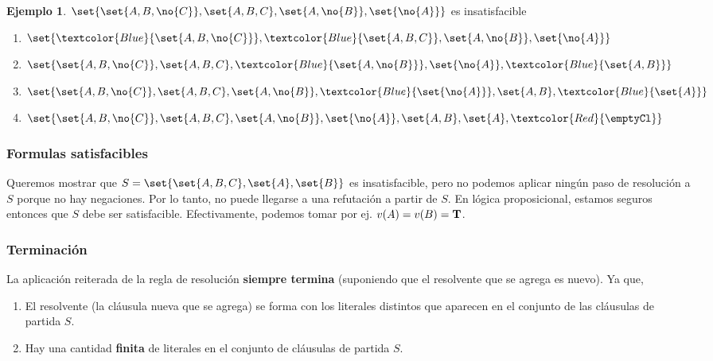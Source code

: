 \documentclass{report}
\theoremstyle{definition} %
\newtheorem*{example*}{Ejemplo}
\newcommand{\changed}[1]{\textcolor{Red}{#1}}
\newcommand{\select}[1]{\textcolor{Blue}{#1}}
\begin{document}
\begin{example*}
\(\set{
    \set{A, B, \no{C}},
    \set{A, B, C},
    \set{A, \no{B}},
    \set{\no{A}}
}\) es insatisfacible
\begin{enumerate}
    \item \(\set{
        \select{\set{A, B, \no{C}}},
        \select{\set{A, B, C}},
        \set{A, \no{B}},
        \set{\no{A}}
    }\)
    \item \(\set{
        \set{A, B, \no{C}},
        \set{A, B, C},
        \select{\set{A, \no{B}}},
        \set{\no{A}},
        \select{\set{A, B}}
    }\)
    \item \(\set{
        \set{A, B, \no{C}},
        \set{A, B, C},
        \set{A, \no{B}},
        \select{\set{\no{A}}},
        \set{A, B},
        \select{\set{A}}
    }\)
    \item \(\set{
        \set{A, B, \no{C}},
        \set{A, B, C},
        \set{A, \no{B}},
        \set{\no{A}},
        \set{A, B},
        \set{A},
        \changed{\emptyCl}
    }\)
\end{enumerate}
\end{example*}

\subsubsection{Formulas satisfacibles}

Queremos mostrar que $S = \set{\set{A, B, C}, \set{A}, \set{B}}$ es
insatisfacible, pero no podemos aplicar ningún paso de resolución a $S$ porque
no hay negaciones. Por lo tanto, no puede llegarse a una refutación a partir de
$S$. En lógica proposicional, estamos seguros entonces que $S$ debe ser
satisfacible. Efectivamente, podemos tomar por ej.
$v(A) = v(B) = \text{\textbf{T}}$.

\subsubsection{Terminación}

La aplicación reiterada de la regla de resolución \textbf{siempre termina}
(suponiendo que el resolvente que se agrega es nuevo). Ya que,

\begin{enumerate}
    \item El resolvente (la cláusula nueva que se agrega) se forma con los
    literales distintos que aparecen en el conjunto de las cláusulas de partida
    $S$.
    \item Hay una cantidad \textbf{finita} de literales en el conjunto de
    cláusulas de partida $S$.
\end{enumerate}
\end{document}
